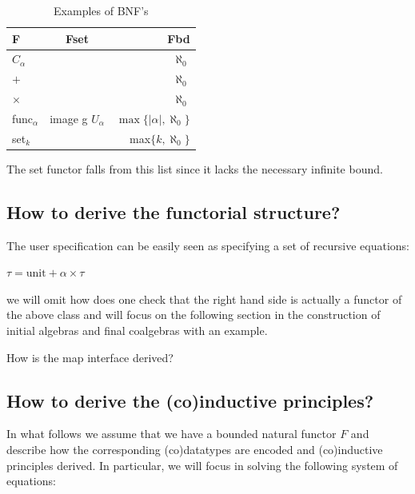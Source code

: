 \begin{table}[h]
	\begin{adjustwidth}{-2.5cm}{}
		\begin{center}
			\begin{tabular}{ | l | c | r | }
				\hline
				F & Fset & Fbd \\ \hline
				$C_{\alpha}$ & & $\aleph_0$ \\
				$+$ &  & $\aleph_0$ \\
				$\times$ &  & $\aleph_0$ \\
				func$_{\alpha}$ & image g $U_{\alpha}$ & $\max\{|\alpha|,\aleph_0\}$  \\
				set$_k$ & & max$\{k,\aleph_0\}$ \\
				\hline
			\end{tabular}
		\end{center}
	\end{adjustwidth}
	\caption{Examples of BNF's}
	\label{table:1}
\end{table}

The set functor falls from this list since it lacks the necessary infinite bound. 

\subsection{How to derive the functorial structure?}





The user specification can be easily seen as specifying a set of recursive equations:

$\tau = \text{unit} + \alpha \times \tau$

we will omit how does one check that the right hand side is actually a functor of the above class and will focus on the following section in the construction of initial algebras and final coalgebras with an example. 


How is the map interface derived? 



\subsection{How to derive the (co)inductive principles?}

In what follows we assume that we have a bounded natural functor $F$ and describe how the corresponding (co)datatypes are encoded and (co)inductive principles derived. In particular, we will focus in solving the following system of equations:

